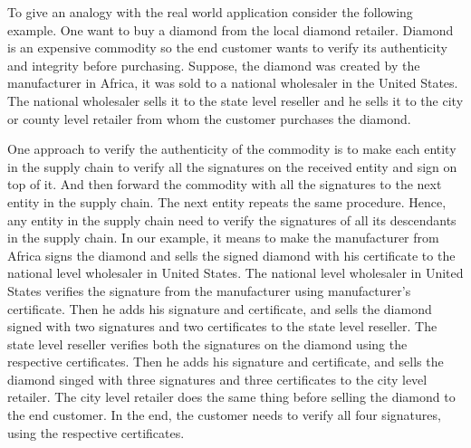 	To give an analogy with the real world application consider the following example.
	One want to buy a diamond from the local diamond retailer.
	Diamond is an expensive commodity so the end customer wants to verify its authenticity and integrity before purchasing.
	Suppose, the diamond was created by the manufacturer in Africa, it was sold to a national wholesaler in the United States. 
	The national wholesaler sells it to the state level reseller and he sells it to the city or county level retailer from whom the customer purchases the diamond.

	One approach to verify the authenticity of the commodity is to make each entity in the supply chain to verify all the signatures on the received entity and sign on top of it.
	And then forward the commodity with all the signatures to the next entity in the supply chain.
	The next entity repeats the same procedure.
	Hence, any entity in the supply chain need to verify the signatures of all its descendants in the supply chain.
	In our example, it means to make the manufacturer from Africa signs the diamond and sells the signed diamond with his certificate to the national level wholesaler in United States.
	The national level wholesaler in United States verifies the signature from the manufacturer using manufacturer's certificate.
	Then he adds his signature and certificate, and sells the diamond signed with two signatures and two certificates to the state level reseller.
	The state level reseller verifies both the signatures on the diamond using the respective certificates.
	Then he adds his signature and certificate, and sells the diamond singed with three signatures and three certificates to the city level retailer. 
	The city level retailer does the same thing before selling the diamond to the end customer.
	In the end, the customer needs to verify all four signatures, using the respective certificates.



